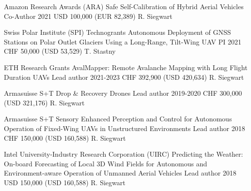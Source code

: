 \label{sec:funding}

\begin{cventries}

\begin{flushleft}
\end{flushleft}
	
\cvgrantentry
	{Amazon Research Awards (ARA)} %
	{Safe Self-Calibration of Hybrid Aerial Vehicles} %
	{Co-Author} %
	{2021} %
	{USD 100,000 (EUR 82,389)} %
	{R. Siegwart} %

\begin{flushleft}
\end{flushleft}

\cvgrantentry
	{Swiss Polar Institute (SPI) Technogrants} %
	{Autonomous Deployment of GNSS Stations on Polar Outlet Glaciers Using a Long-Range, Tilt-Wing UAV} %
	{PI} %
	{2021} %
	{CHF 50,000 (USD 53,529)} %
	{T. Stastny} %

\cvgrantentry
	{ETH Research Grants} %
	{AvalMapper: Remote Avalanche Mapping with Long Flight Duration UAVs} %
	{Lead author} %
	{2021-2023} %
	{CHF 392,900 (USD 420,634)} %
	{R. Siegwart} %
	
\cvgrantentry
	{Armasuisse S+T} %
	{Drop \& Recovery Drones} %
	{Lead author} %
	{2019-2020} %
	{CHF 300,000 (USD 321,176)} %
	{R. Siegwart} %

\cvgrantentry
	{Armasuisse S+T} %
	{Sensory Enhanced Perception and Control for Autonomous Operation of Fixed-Wing UAVs in Unstructured Environments} %
	{Lead author} %
	{2018} %
	{CHF 150,000 (USD 160,588)} %
	{R. Siegwart} %
	
\cvgrantentry
	{Intel University-Industry Research Corporation (UIRC)} %
	{Predicting the Weather: On-board Forecasting of Local 3D Wind Fields for Autonomous and Environment-aware Operation of Unmanned Aerial Vehicles} %
	{Lead author} %
	{2018} %
	{USD 150,000 (USD 160,588)} %
	{R. Siegwart} %
	

\end{cventries}
